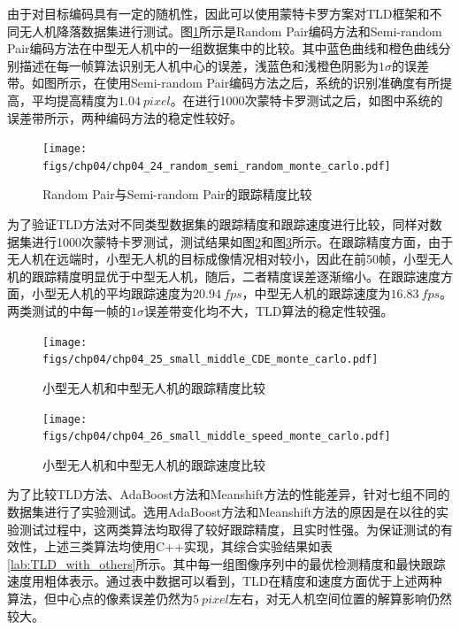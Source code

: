 由于对目标编码具有一定的随机性，因此可以使用蒙特卡罗方案对TLD框架和不同无人机降落数据集进行测试。图\ref{fig:chp04_24_random_semi_random_monte_carlo}所示是Random Pair编码方法和Semi-random Pair编码方法在中型无人机中的一组数据集中的比较。其中蓝色曲线和橙色曲线分别描述在每一帧算法识别无人机中心的误差，浅蓝色和浅橙色阴影为$1\sigma$的误差带。如图所示，在使用Semi-random Pair编码方法之后，系统的识别准确度有所提高，平均提高精度为$1.04\ pixel$。在进行1000次蒙特卡罗测试之后，如图中系统的误差带所示，两种编码方法的稳定性较好。

\begin{figure}[ht]   
	\centering
	\texttt{[image: figs/chp04/chp04\_24\_random\_semi\_random\_monte\_carlo.pdf]}
	\caption{Random Pair与Semi-random Pair的跟踪精度比较}
	\label{fig:chp04_24_random_semi_random_monte_carlo}
\end{figure}

为了验证TLD方法对不同类型数据集的跟踪精度和跟踪速度进行比较，同样对数据集进行1000次蒙特卡罗测试，测试结果如图\ref{fig:chp04_25_small_middle_CDE_monte_carlo}和图\ref{fig:chp04_26_small_middle_speed_monte_carlo}所示。在跟踪精度方面，由于无人机在远端时，小型无人机的目标成像情况相对较小，因此在前50帧，小型无人机的跟踪精度明显优于中型无人机，随后，二者精度误差逐渐缩小。在跟踪速度方面，小型无人机的平均跟踪速度为$20.94\ fps$，中型无人机的跟踪速度为$16.83\ fps$。两类测试的中每一帧的$1\sigma$误差带变化均不大，TLD算法的稳定性较强。

\begin{figure}[ht]   
	\centering
	\texttt{[image: figs/chp04/chp04\_25\_small\_middle\_CDE\_monte\_carlo.pdf]}
	\caption{小型无人机和中型无人机的跟踪精度比较}
	\label{fig:chp04_25_small_middle_CDE_monte_carlo}
\end{figure}

\begin{figure}[ht]   
	\centering
	\texttt{[image: figs/chp04/chp04\_26\_small\_middle\_speed\_monte\_carlo.pdf]}
	\caption{小型无人机和中型无人机的跟踪速度比较}
	\label{fig:chp04_26_small_middle_speed_monte_carlo}
\end{figure}

为了比较TLD方法、AdaBoost方法和Meanshift方法的性能差异，针对七组不同的数据集进行了实验测试。选用AdaBoost方法和Meanshift方法的原因是在以往的实验测试过程中，这两类算法均取得了较好跟踪精度，且实时性强。为保证测试的有效性，上述三类算法均使用C++实现，其综合实验结果如表\ref{lab:TLD_with_others}所示。其中每一组图像序列中的最优检测精度和最快跟踪速度用粗体表示。通过表中数据可以看到，TLD在精度和速度方面优于上述两种算法，但中心点的像素误差仍然为$5\ pixel$左右，对无人机空间位置的解算影响仍然较大。

